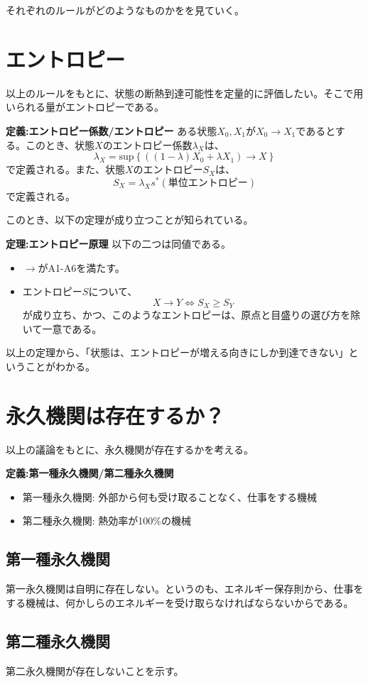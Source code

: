 \documentclass[a3paper, twocolumn, 30pt]{jsarticle}
\begin{document}
それぞれのルールがどのようなものかをを見ていく。\\

\section{エントロピー}
以上のルールをもとに、状態の断熱到達可能性を定量的に評価したい。そこで用いられる量がエントロピーである。\\
\begin{itembox}[l]{\textbf{定義:エントロピー係数/エントロピー}}
    ある状態$X_0,X_1$が$X_0 \rightarrow X_1$であるとする。このとき、状態$X$のエントロピー係数$\lambda_X$は、
    \begin{equation}
        \lambda_X = \text{sup} \left\{ ((1-\lambda)X_0 + \lambda X_1) \rightarrow X \right\}
    \end{equation}
    で定義される。また、状態$X$のエントロピー$S_X$は、
    \begin{equation}
        S_X = \lambda_X s^*(\text{単位エントロピー})
    \end{equation}
    で定義される。
\end{itembox}
このとき、以下の定理が成り立つことが知られている。
\begin{itembox}[l]{\textbf{定理:エントロピー原理}}
    以下の二つは同値である。
    \begin{itemize}
        \item $\rightarrow$がA1-A6を満たす。
        \item エントロピー$S$について、
        \begin{equation}
            X \rightarrow Y \Leftrightarrow S_X \geq S_Y
        \end{equation}
        が成り立ち、かつ、このようなエントロピーは、原点と目盛りの選び方を除いて一意である。
    \end{itemize}
\end{itembox}
以上の定理から、「状態は、エントロピーが増える向きにしか到達できない」ということがわかる。\\

\section{永久機関は存在するか？}
以上の議論をもとに、永久機関が存在するかを考える。
\begin{itembox}[l]{\textbf{定義:第一種永久機関/第二種永久機関}}
    \begin{itemize}
        \item 第一種永久機関: 外部から何も受け取ることなく、仕事をする機械
        \item 第二種永久機関: 熱効率が100\%の機械
    \end{itemize}
\end{itembox}

\subsection{第一種永久機関}
第一永久機関は自明に存在しない。というのも、エネルギー保存則から、仕事をする機械は、何かしらのエネルギーを受け取らなければならないからである。\\

\subsection{第二種永久機関}
第二永久機関が存在しないことを示す。
\end{document}
